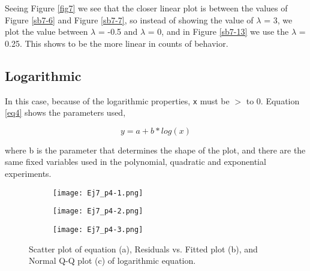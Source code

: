 \documentclass{article}
\begin{document}
Seeing Figure \ref{fig7} we see that the closer linear plot is between the values of Figure \ref{sb7-6} and Figure \ref{sb7-7}, so instead of showing the value of $\lambda$ = 3, we plot the value between $\lambda$ = -0.5 and $\lambda$ = 0, and in Figure \ref{sb7-13} we use the $\lambda$ = 0.25. This shows to be the more linear in counts of behavior. \\

\clearpage

\subsection{Logarithmic}

In this case, because of the logarithmic properties, \texttt{x} must be $>$ to 0. Equation \ref{eq4} shows the parameters used, 

\begin{equation} \label{eq4}
y = a + b * log(x)
\end{equation} 

where b is the parameter that determines the shape of the plot, and there are the same fixed variables used in the polynomial, quadratic and exponential experiments.\\

\begin{figure}[]
\begin{subfigure}{.3\textwidth}
  \centering
  \texttt{[image: Ej7\_p4-1.png]}  
  \caption{ }
  \label{sb8-1}
\end{subfigure}
\begin{subfigure}{.3\textwidth}
  \centering
  \texttt{[image: Ej7\_p4-2.png]}  
  \caption{ }
  \label{sb8-2}
\end{subfigure}
\begin{subfigure}{.3\textwidth}
  \centering
  \texttt{[image: Ej7\_p4-3.png]}  
  \caption{ }
  \label{sb8-3}
\end{subfigure}
\caption{Scatter plot of equation (a), Residuals vs. Fitted plot (b), and Normal Q-Q plot (c) of logarithmic equation.}
\label{fig8}
\end{figure}
\end{document}
